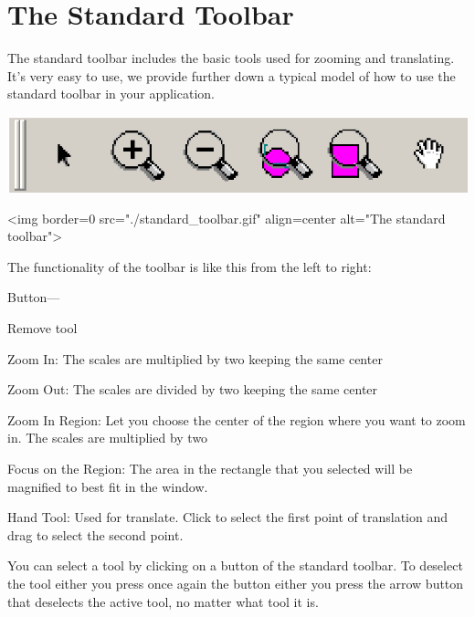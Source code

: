 \section{The Standard Toolbar}
\label{Qt_widget_standard_toolbar}

The standard toolbar includes the basic tools used for zooming and translating.
It's very easy to use, we provide further down a typical model of how to use 
the standard toolbar in your application.

\begin{ccTexOnly}
\begin{center}
\includegraphics{standard_toolbar.eps} 
\end{center}
\end{ccTexOnly}
\begin{ccHtmlOnly}
<img border=0 src="./standard_toolbar.gif"  align=center  alt="The standard toolbar">
\end{ccHtmlOnly}

The functionality of the toolbar is like this from the left to right:
\begin{list}
	{Button---}{\setlength{\rightmargin}{\leftmargin}}
	\item Remove tool

	\item Zoom In: The scales are multiplied by two keeping the same center

	\item Zoom Out: The scales are divided by two keeping the same center

	\item Zoom In Region: Let you choose the center of the region where you want to zoom in. The scales are multiplied by two

	\item Focus on the Region: The area in the rectangle that you selected will be magnified to best fit in the window.

	\item Hand Tool: Used for translate. Click to select the first point of translation and drag to select the second point.
\end{list}

You can select a tool by clicking on a button of the standard toolbar. To deselect the tool either you press once again the button either you press the arrow button that deselects the active tool, no matter what tool it is.

